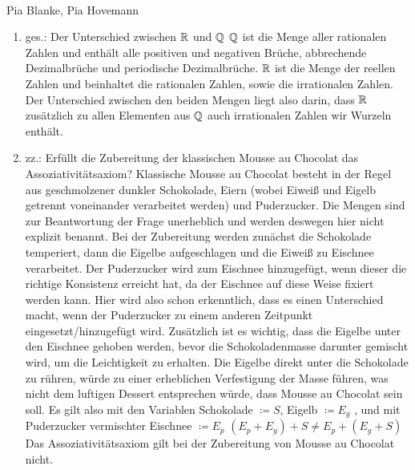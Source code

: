 \bigskip

\begin{lsg}\mbox{ }
\item [Pia Blanke, Pia Hovemann]
\begin{enumerate}[label=$\mathrm{(\roman*)}$, ref=$\mathrm{\roman*}$]
\item ges.: Der Unterschied zwischen $\mathbb{R}$ und $\mathbb{Q}$ 
$\mathbb{Q}$  ist die Menge aller rationalen Zahlen und enth\"alt alle positiven und negativen Br\"uche, abbrechende Dezimalbr\"uche und periodische Dezimalbr\"uche.
$\mathbb{R}$ ist die Menge der reellen Zahlen und beinhaltet die rationalen Zahlen, sowie die irrationalen Zahlen.
Der Unterschied zwischen den beiden Mengen liegt also darin, dass $\mathbb{R}$ zus\"atzlich zu allen Elementen aus $\mathbb{Q}$  auch irrationalen Zahlen wir Wurzeln enth\"alt.
%
\item zz.: Erf\"ullt die Zubereitung der klassischen Mousse au Chocolat das Assoziativit\"atsaxiom?
Klassische Mousse au Chocolat besteht in der Regel aus geschmolzener dunkler Schokolade, Eiern (wobei Eiwei{\ss} und Eigelb getrennt voneinander verarbeitet werden) und Puderzucker. Die Mengen sind zur Beantwortung der Frage unerheblich und werden deswegen hier nicht explizit benannt.
Bei der Zubereitung werden zun\"achst die Schokolade temperiert, dann die Eigelbe aufgeschlagen und die Eiwei{\ss} zu Eischnee verarbeitet. Der Puderzucker wird zum Eischnee hinzugef\"ugt, wenn dieser die richtige Konsistenz erreicht hat, da der Eischnee auf diese Weise fixiert werden kann. Hier wird also schon erkenntlich, dass es einen Unterschied macht, wenn der Puderzucker zu einem anderen Zeitpunkt eingesetzt/hinzugef\"ugt wird. 
Zus\"atzlich ist es wichtig, dass die Eigelbe unter den Eischnee gehoben werden, bevor die Schokoladenmasse darunter gemischt wird, um die Leichtigkeit zu erhalten. Die Eigelbe direkt unter die Schokolade zu r\"uhren, w\"urde zu einer erheblichen Verfestigung der Masse f\"uhren, was nicht dem luftigen Dessert entsprechen w\"urde, dass Mousse au Chocolat sein soll.
Es gilt also mit den Variablen Schokolade $\coloneqq S$, Eigelb $\coloneqq E_{g}$ , und mit Puderzucker vermischter Eischnee $\coloneqq E_{p}$
$(E_{p} + E_{g}) + S \neq E_{p} + (E_{g} + S)$
Das Assoziativit\"atsaxiom gilt bei der Zubereitung von Mousse au Chocolat nicht.
\end{enumerate}
\end{lsg}
